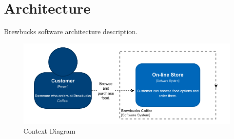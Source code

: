 \documentclass{article}
\begin{document}
\section{Architecture}
Brewbucks software architecture description.

\begin{figure}
    \centering
    \includegraphics[width=0.5\linewidth]{model//c4//pdf/context_drawio.pdf}
    \caption{Context Diagram}
    \label{fig:context}
\end{figure}
\end{document}
